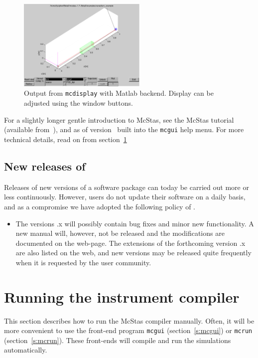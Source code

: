 \begin{figure}[htb!]
  \begin{center}
    \includegraphics[width=0.55\textwidth]{figures/mcdisplay_Matlab}
  \end{center}
  \caption{Output from \texttt{mcdisplay} with Matlab backend. Display can be
    adjusted using the window buttons.}
\label{fig:mcdisp_Matlab}
\end{figure}

For a slightly longer gentle introduction to McStas, see the McStas tutorial
(available from~\cite{mcstas_webpage}), and as of version \version\ built into
the \verb+mcgui+ help menu. For more technical details, read on from
section~\ref{s:running}

\subsection{New releases of \MCS}
Releases of new versions of a software package can today be carried out more or
less continuously. However, users do not update their software on a daily basis,
and as a compromise we have adopted the following policy of \MCS .

\begin{itemize}
\item The versions {\version}.x will possibly contain bug fixes and minor new
  functionality. A new manual will, however, not be released and the
  modifications are documented on the \MCS web-page. The extensions of the
  forthcoming version {\version}.x are also listed on the web, and new versions
  may be released quite frequently when it is requested by the user community.
\end{itemize}

\section{Running the instrument compiler}
\label{s:running}

This section describes how to run the McStas compiler manually. Often,
it will be more convenient to use the front-end program \verb+mcgui+
(section~\ref{s:mcgui}) or \verb+mcrun+ (section~\ref{s:mcrun}). These
front-ends will compile and run the simulations automatically.
 


